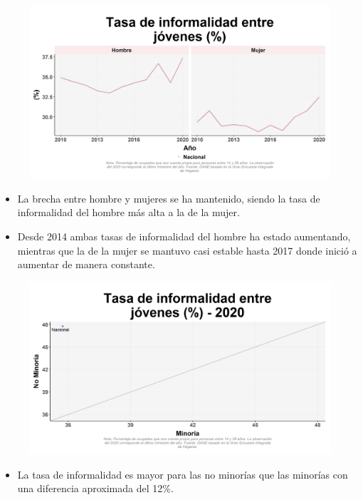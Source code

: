     \begin{figure}[H]
        \caption[Tasa de informalidad entre jóvenes por género ]{\label{informaljov__gen_trend} }
        \begin{center}
        \includegraphics[width=\textwidth,keepaspectratio]{img/var_75_trend.png}
        \end{center}
    \end{figure}
            \begin{itemize}
                \item La brecha entre hombre y mujeres se ha mantenido, siendo la tasa de informalidad del hombre más alta a la de la mujer.
                \item Desde 2014 ambas tasas de informalidad del hombre ha estado aumentando, mientras que la de la mujer se mantuvo casi estable hasta 2017 donde inició a aumentar de manera constante.
                \end{itemize}

    \begin{figure}[H]
        \caption[Tasa de informalidad entre jóvenes por minorías y no minorías para 2020 ]{\label{informaljov_minoria_scatter} }
        \begin{center}
        \includegraphics[width=\textwidth,keepaspectratio]{img/var_74_scatter.png}
        \end{center}
    \end{figure}
            \begin{itemize}
                \item La tasa de informalidad es mayor para las no minorías que las minorías con una diferencia aproximada del 12\%.
                \end{itemize}


